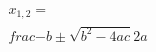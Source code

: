 \documentclass[preview]{standalone}
\begin{document}
\begin{align*}
x_{1, 2} = \\frac{-b\pm\sqrt{b^2-4ac}}{2a}
\end{align*}
\end{document}
